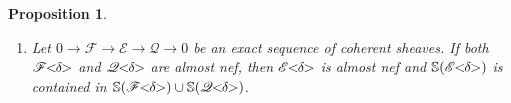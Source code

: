 \documentclass[english,reqno]{amsart}
\newcommand\bbS{{\mathbb S}}
\newcommand\sE{{\mathscr E}}
\newcommand\sF{{\mathscr F}}
\newcommand\sQ{{\mathscr Q}}
\theoremstyle{plain}
\newtheorem{prop}[thm]{Proposition}
\theoremstyle{definition}
\numberwithin{equation}{section} %
\begin{document}
\begin{prop}
\begin{enumerate}
        \item Let $0\rightarrow \sF\rightarrow \sE\rightarrow \sQ\rightarrow 0$ be an exact sequence of coherent sheaves. If both $\sF\hspace{-0.8ex}<\hspace{-0.8ex}\delta\hspace{-0.8ex}>$ and $\sQ\hspace{-0.8ex}<\hspace{-0.8ex}\delta\hspace{-0.8ex}>$ are almost nef, then $\sE\hspace{-0.8ex}<\hspace{-0.8ex}\delta\hspace{-0.8ex}>$ is almost nef and $\bbS(\sE\hspace{-0.8ex}<\hspace{-0.8ex}\delta\hspace{-0.8ex}>)$ is contained in $\bbS(\sF\hspace{-0.8ex}<\hspace{-0.8ex}\delta\hspace{-0.8ex}>)\cup\bbS(\sQ\hspace{-0.8ex}<\hspace{-0.8ex}\delta\hspace{-0.8ex}>)$.
    \end{enumerate}
\end{prop}
\end{document}

